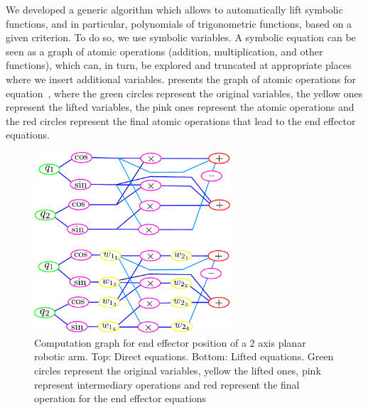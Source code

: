 We developed a generic algorithm which allows to automatically lift symbolic functions, and in particular, polynomials of trigonometric functions, based on a given criterion.
To do so, we use symbolic variables.
A symbolic equation can be seen as a graph of atomic operations (addition, multiplication, and other functions), which can, in turn, be explored and truncated at appropriate places where we insert additional variables.
 presents the graph of atomic operations for equation~, where the green circles represent the original variables, the yellow ones represent the lifted variables, the pink ones represent the atomic operations and the red circles represent the final atomic operations that lead to the end effector equations.
\begin{figure}
  \centering
  \includegraphics[width=0.65\textwidth]{graphDirectLiftedEEPos.pdf}
  \caption{Computation graph for end effector position of a 2 axis planar robotic arm. Top: Direct equations. Bottom: Lifted equations. Green circles represent the original variables, yellow the lifted ones, pink represent intermediary operations and red represent the final operation for the end effector equations}
\label{fig:graph_direct}
\end{figure}

